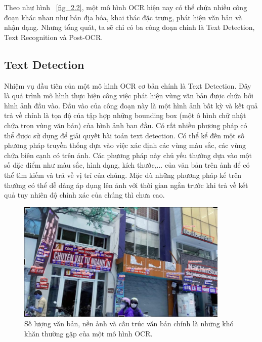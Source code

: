 Theo như hình ~\ref{fig_2.2}, một mô hình OCR hiện nay có thể chứa nhiều công đoạn khác nhau như bản địa hóa, khai
thác đặc trưng, phát hiện văn bản và nhận dạng. Nhưng tổng quát, ta sẽ chỉ có ba công
đoạn chính là Text Detection, Text Recognition và Post-OCR.

\subsection{Text Detection}
Nhiệm vụ đầu tiên của một mô hình OCR cơ bản chính là Text Detection. Đây là quá trình
mô hình thực hiện công việc phát hiện vùng văn bản được chứa bởi hình ảnh đầu vào. Đầu
vào của công đoạn này là một hình ảnh bất kỳ và kết quả trả về chính là tọa độ của tập hợp
những bounding box (một ô hình chữ nhật chứa trọn vùng văn bản) của hình ảnh ban đầu.
Có rất nhiều phương pháp có thể được sử dụng để giải quyết bài toán text detection. Có thể
kể đến một số phương pháp truyền thống dựa vào việc xác định các vùng màu sắc, các
vùng chứa biên cạnh có trên ảnh. Các phương pháp này chủ yếu thường dựa vào một số
đặc điểm như màu sắc, hình dạng, kích thước,... của văn bản trên ảnh để có thể tìm kiếm
và trả về vị trí của chúng. Mặc dù những phương pháp kể trên thường có thể dễ dàng áp
dụng lên ảnh với thời gian ngắn trước khi trả về kết quả tuy nhiên độ chính xác của chúng
thì chưa cao.

\begin{figure}
\centering
\includegraphics[width=0.9\textwidth]{mep_img/Capture.JPG}
\caption{Số lượng văn bản, nền ảnh và cấu trúc văn bản chính là những khó khăn thường gặp của một mô hình OCR.}\label{fig_2.3}
\end{figure}

